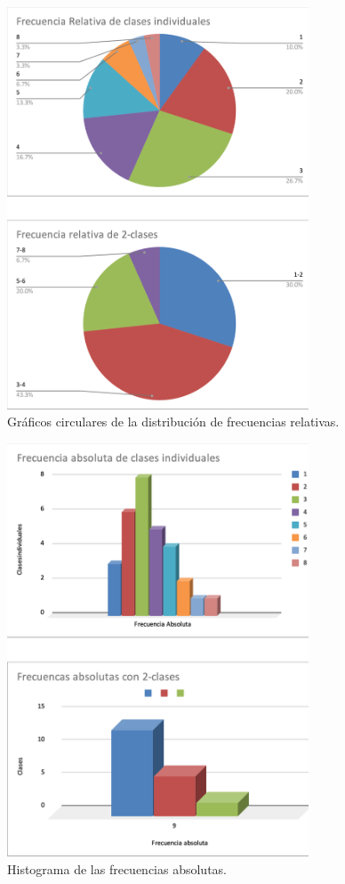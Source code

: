 \documentclass[12pt]{article}
\begin{document}
	\begin{figure}[htp]
		\centering
			\includegraphics[width=0.8\textwidth]{Graficas-0.png}
		\caption{Gráficos circulares de la distribuci\'on de frecuencias relativas.}
		\label{fig: gr 1}
	\end{figure}
	\begin{figure}[htp]
		\centering
			\includegraphics[width=0.8\textwidth]{Graficas-1.png}
		\caption{Histograma de las frecuencias absolutas.}
		\label{fig: gr 2}
	\end{figure}
\end{document}
